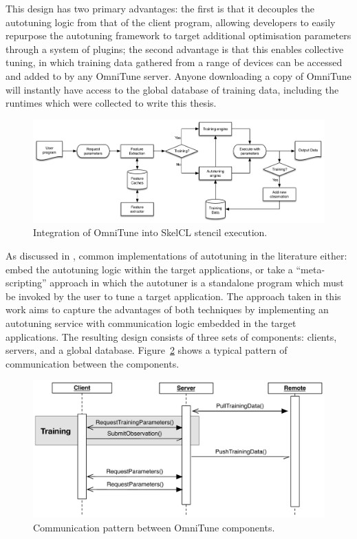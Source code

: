 This design has two primary advantages: the first is that it decouples
the autotuning logic from that of the client program, allowing
developers to easily repurpose the autotuning framework to target
additional optimisation parameters through a system of plugins; the
second advantage is that this enables collective tuning, in which
training data gathered from a range of devices can be accessed and
added to by any OmniTune server. Anyone downloading a copy of OmniTune
will instantly have access to the global database of training data,
including the  runtimes which were collected to
write this thesis.


\begin{figure}
\centering
\includegraphics[width=\textwidth]{img/omnitune-system-flow.pdf}
\caption{%
  Integration of OmniTune into SkelCL stencil execution.%
}
\label{fig:omnitune-system-flow}
\end{figure}

As discussed in , common implementations of
autotuning in the literature either: embed the autotuning logic within
the target applications, or take a ``meta-scripting'' approach in
which the autotuner is a standalone program which must be invoked by
the user to tune a target application. The approach taken in this work
aims to capture the advantages of both techniques by implementing an
autotuning service with communication logic embedded in the target
applications. The resulting design consists of three sets of
components: clients, servers, and a global
database. Figure~\ref{fig:omnitune-comms} shows a typical pattern of
communication between the components.

\begin{figure}
\centering
\includegraphics[width=\textwidth]{img/omnitune-comms.pdf}
\caption{%
  Communication pattern between OmniTune components.%
}
\label{fig:omnitune-comms}
\end{figure}


